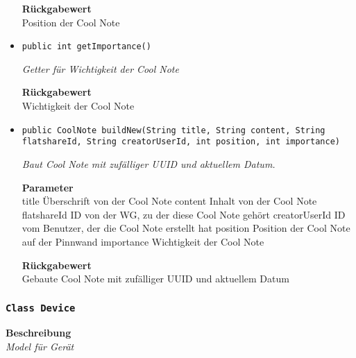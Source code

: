 \begin{itemize}
    	
    	
    	\textbf{Rückgabewert} \\
    	Position der Cool Note        \item{\texttt{public int getImportance()}}
    	
    	\textit{Getter für Wichtigkeit der Cool Note}
    	
    	
    	
    	\textbf{Rückgabewert} \\
    	Wichtigkeit der Cool Note        \item{\texttt{public CoolNote buildNew(String title, String content, String flatshareId, String creatorUserId, int position, int importance)}}
    	
    	\textit{Baut Cool Note mit zufälliger UUID und aktuellem Datum.}
    	
    	\textbf{Parameter} \\
    	title Überschrift von der Cool Note
    	content Inhalt von der Cool Note
    	flatshareId ID von der WG, zu der diese Cool Note gehört
    	creatorUserId ID vom Benutzer, der die Cool Note erstellt hat
    	position Position der Cool Note auf der Pinnwand
    	importance Wichtigkeit der Cool Note
    	
    	\textbf{Rückgabewert} \\
    	Gebaute Cool Note mit zufälliger UUID und aktuellem Datum
    \end{itemize}
    \subsubsection{\texttt{Class Device}}
    \textbf{Beschreibung} \\
    \textit{Model für Gerät}
